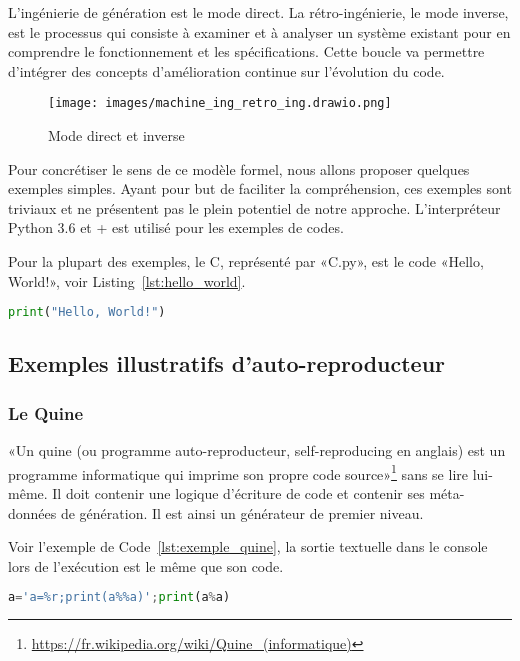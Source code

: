 L’ingénierie de génération est le mode direct. La rétro-ingénierie, le mode inverse, est le processus qui consiste à examiner et à analyser un système existant pour en comprendre le fonctionnement et les spécifications. Cette boucle va permettre d’intégrer des concepts d’amélioration continue sur l’évolution du code.

\begin{figure}[htb]
\centering
\texttt{[image: images/machine\_ing\_retro\_ing.drawio.png]}
\caption{Mode direct et inverse}
\label{fig:mode_direct_inverse}
\end{figure}

Pour concrétiser le sens de ce modèle formel, nous allons proposer quelques exemples simples. Ayant pour but de faciliter la compréhension, ces exemples sont triviaux et ne présentent pas le plein potentiel de notre approche. L’interpréteur Python 3.6 et + est utilisé pour les exemples de codes.

Pour la plupart des exemples, le C, représenté par «C.py», est le code «Hello, World!», voir Listing~\ref{lst:hello_world}.

\begin{lstlisting}[language=Python, upquote=true, caption={Exemple de code Hello, World!}, label={lst:hello_world}]
print("Hello, World!")
\end{lstlisting}

\subsection{Exemples illustratifs d’auto-reproducteur}\label{exemple_illustratif_auto_reproducteur}

\subsubsection{Le Quine}

«Un quine\cite{sarkar2020quines} (ou programme auto-reproducteur, self-reproducing en anglais) est un programme informatique qui imprime son propre code source»\footnote{\url{https://fr.wikipedia.org/wiki/Quine_(informatique)}} sans se lire lui-même. Il doit contenir une logique d’écriture de code et contenir ses méta-données de génération. Il est ainsi un générateur de premier niveau.


Voir l'exemple de Code~\ref{lst:exemple_quine}, la sortie textuelle dans le console lors de l'exécution est le même que son code.

\begin{lstlisting}[language=Python, upquote=true, caption={Exemple de code Quine}, label={lst:exemple_quine}]
a='a=%r;print(a%%a)';print(a%a)
\end{lstlisting}

